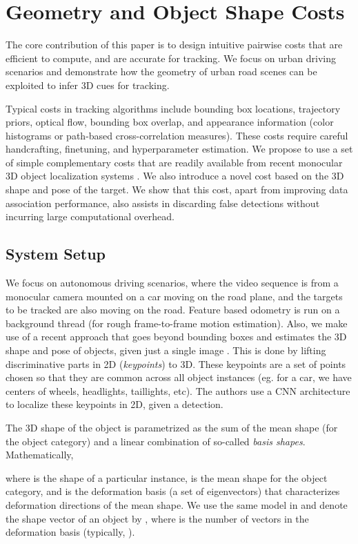 \documentclass[letterpaper, 10 pt, conference]{ieeeconf}
\begin{document}
\section{Geometry and Object Shape Costs}

The core contribution of this paper is to design intuitive pairwise costs that are efficient to compute, and are accurate for tracking. We focus on urban driving scenarios and demonstrate how the geometry of urban road scenes can be exploited to infer 3D cues for tracking.

Typical costs in tracking algorithms include bounding box locations, trajectory priors, optical flow, bounding box overlap, and appearance information (color histograms or path-based cross-correlation measures). These costs require careful handcrafting, finetuning, and hyperparameter estimation. We propose to use a set of simple complementary costs that are readily available from recent monocular 3D object localization systems \cite{KM_ICRA,KM_IROS}. We also introduce a novel cost based on the 3D shape and pose of the target. We show that this cost, apart from improving data association performance, also assists in discarding false detections without incurring large computational overhead.

\subsection{System Setup}

We focus on autonomous driving scenarios, where the video sequence is from a monocular camera mounted on a car moving on the road plane, and the targets to be tracked are also moving on the road. Feature based odometry is run on a background thread (for rough frame-to-frame motion estimation). Also, we make use of a recent approach that goes beyond bounding boxes and estimates the 3D shape and pose of objects, given just a single image \cite{KM_ICRA}. This is done by lifting discriminative parts in 2D (\emph{keypoints}) to 3D. These keypoints are a set of points chosen so that they are common across all object instances (eg. for a car, we have centers of wheels, headlights, taillights, etc). The authors use a CNN architecture \cite{KM_IROS} to localize these keypoints in 2D, given a detection.

The 3D shape of the object is parametrized as the sum of the mean shape (for the object category) and a linear combination of so-called \emph{basis shapes}. Mathematically, 

where  is the shape of a particular instance,  is the mean shape for the object category, and  is the deformation basis (a set of eigenvectors) that characterizes deformation directions of the mean shape. We use the same model in \cite{KM_ICRA} and denote the shape vector of an object by , where  is the number of vectors in the deformation basis (typically, ). 
\end{document}
